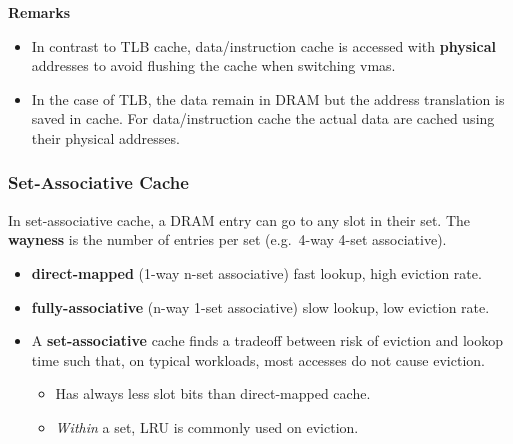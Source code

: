 \newpar{}
\textbf{Remarks}
\begin{itemize}
    \item In contrast to TLB cache, data/instruction cache is accessed with \textbf{physical} addresses to avoid flushing the cache when switching vmas.
    \item In the case of TLB, the data remain in DRAM but the address translation is saved in cache. For data/instruction cache the actual data are cached using their physical addresses.
\end{itemize}

\subsubsection{Set-Associative Cache}
In set-associative cache, a DRAM entry can go to any slot in their set. The \textbf{wayness} is the number of entries per set (e.g.\ 4-way 4-set associative).

\begin{itemize}
    \item \textbf{direct-mapped} (1-way n-set associative) fast lookup, high eviction rate. %
    \item \textbf{fully-associative} (n-way 1-set associative) slow lookup, low eviction rate. %
    \item A \textbf{set-associative} cache finds a tradeoff between risk of eviction and lookop time such that, on typical workloads, most accesses do not cause eviction.
    \begin{itemize}
        \item Has always less slot bits than direct-mapped cache.
        \item \textit{Within} a set, LRU is commonly used on eviction.
    \end{itemize}
\end{itemize}

